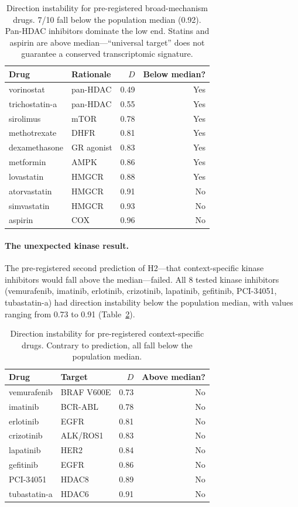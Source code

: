 \documentclass{article}
\begin{document}
\begin{table}[t]
\centering
\caption{Direction instability for pre-registered broad-mechanism drugs.
7/10 fall below the population median (0.92). Pan-HDAC inhibitors dominate
the low end. Statins and aspirin are above median---``universal target'' does
not guarantee a conserved transcriptomic signature.}
\label{tab:broad}
\small
\begin{tabular}{llrr}
\toprule
Drug & Rationale & $D$ & Below median? \\
\midrule
vorinostat & pan-HDAC & 0.49 & Yes \\
trichostatin-a & pan-HDAC & 0.55 & Yes \\
sirolimus & mTOR & 0.78 & Yes \\
methotrexate & DHFR & 0.81 & Yes \\
dexamethasone & GR agonist & 0.83 & Yes \\
metformin & AMPK & 0.86 & Yes \\
lovastatin & HMGCR & 0.88 & Yes \\
atorvastatin & HMGCR & 0.91 & No \\
simvastatin & HMGCR & 0.93 & No \\
aspirin & COX & 0.96 & No \\
\bottomrule
\end{tabular}
\end{table}

\paragraph{The unexpected kinase result.}
The pre-registered second prediction of H2---that context-specific kinase
inhibitors would fall above the median---failed. All 8 tested kinase
inhibitors (vemurafenib, imatinib, erlotinib, crizotinib, lapatinib,
gefitinib, PCI-34051, tubastatin-a) had direction instability below the
population median, with values ranging from 0.73 to 0.91
(Table~\ref{tab:specific}).

\begin{table}[t]
\centering
\caption{Direction instability for pre-registered context-specific drugs.
Contrary to prediction, all fall below the population median.}
\label{tab:specific}
\small
\begin{tabular}{llrr}
\toprule
Drug & Target & $D$ & Above median? \\
\midrule
vemurafenib & BRAF V600E & 0.73 & No \\
imatinib & BCR-ABL & 0.78 & No \\
erlotinib & EGFR & 0.81 & No \\
crizotinib & ALK/ROS1 & 0.83 & No \\
lapatinib & HER2 & 0.84 & No \\
gefitinib & EGFR & 0.86 & No \\
PCI-34051 & HDAC8 & 0.89 & No \\
tubastatin-a & HDAC6 & 0.91 & No \\
\bottomrule
\end{tabular}
\end{table}
\end{document}
